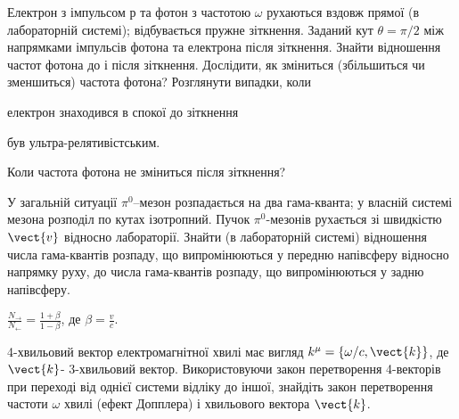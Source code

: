 \begin{problem}
Електрон з імпульсом $р$ та фотон з частотою $\omega$ рухаються вздовж прямої (в лабораторній системі); відбувається пружне зіткнення. Заданий кут $\theta = \pi/2$ між напрямками імпульсів фотона та електрона після зіткнення. Знайти відношення частот фотона до і після зіткнення. Дослідити, як зміниться (збільшиться чи зменшиться) частота фотона? Розглянути випадки, коли
\begin{enumerate*}[label=\alph*)]
	\item електрон знаходився в спокої до зіткнення
	\item був ультра-релятивістським.
\end{enumerate*}
Коли частота фотона не зміниться після зіткнення?
\end{problem}

\begin{problem}
У загальній ситуації $\pi^0$–мезон розпадається на два гама-кванта; у власній системі мезона розподіл по кутах ізотропний. Пучок $\pi^0$-мезонів рухається зі швидкістю $\vect{v}$ відносно лабораторії. Знайти (в лабораторній системі) відношення числа гама-квантів розпаду, що випромінюються у передню напівсферу відносно напрямку руху, до числа гама-квантів розпаду, що випромінюються у задню напівсферу.
\begin{solution}
	$\frac{N_\rightarrow}{N_\leftarrow} = \frac{1+ \beta}{1-\beta}$, де $\beta = \frac{v}{c}$.
\end{solution}
\end{problem}

\begin{problem}
    4-хвильовий вектор електромагнітної хвилі має вигляд $k^{\mu} = \{\omega/c,\vect{k}\}$, де $\vect{k}$- 3-хвильовий вектор. Використовуючи закон перетворення 4-векторів при переході від однієї системи відліку до іншої, знайдіть закон перетворення частоти $\omega$ хвилі (ефект Допплера) і хвильового вектора $\vect{k}$. 
\end{problem}



